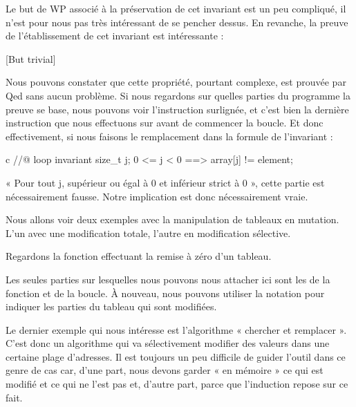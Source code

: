 Le but de WP associé à la préservation de cet invariant est un peu compliqué, il
n'est pour nous pas très intéressant de se pencher dessus. En revanche, la 
preuve de l'établissement de cet invariant est intéressante :



[But trivial]


Nous pouvons constater que cette propriété, pourtant complexe, est prouvée par 
Qed sans aucun problème. Si nous regardons sur quelles parties du programme la 
preuve se base, nous pouvons voir l'instruction  surlignée, et c'est 
bien la dernière instruction que nous effectuons sur  avant de commencer
la boucle. Et donc effectivement, si nous faisons le remplacement dans la formule 
de l'invariant :



\begin{CodeBlock}{c}
//@ loop invariant \forall size_t j; 0 <= j < 0 ==> array[j] != element;
\end{CodeBlock}



« Pour tout j, supérieur ou égal à 0 et inférieur strict à 0 », cette partie est
nécessairement fausse. Notre implication est donc nécessairement vraie.





Nous allons voir deux exemples avec la manipulation de tableaux en mutation. 
L'un avec une modification totale, l'autre en modification sélective.





Regardons la fonction effectuant la remise à zéro d'un tableau.






Les seules parties sur lesquelles nous pouvons nous attacher ici sont 
les  de la fonction et de la boucle. À nouveau, nous pouvons
utiliser la notation  pour indiquer les parties du tableau 
qui sont modifiées.





Le dernier exemple qui nous intéresse est l'algorithme « chercher et remplacer ». 
C'est donc un algorithme qui va sélectivement modifier des valeurs dans une 
certaine plage d'adresses. Il est toujours un peu difficile de guider l'outil 
dans ce genre de cas car, d'une part, nous devons garder « en mémoire » ce qui est modifié 
et ce qui ne l'est pas et, d'autre part, parce que l'induction repose sur ce fait.



